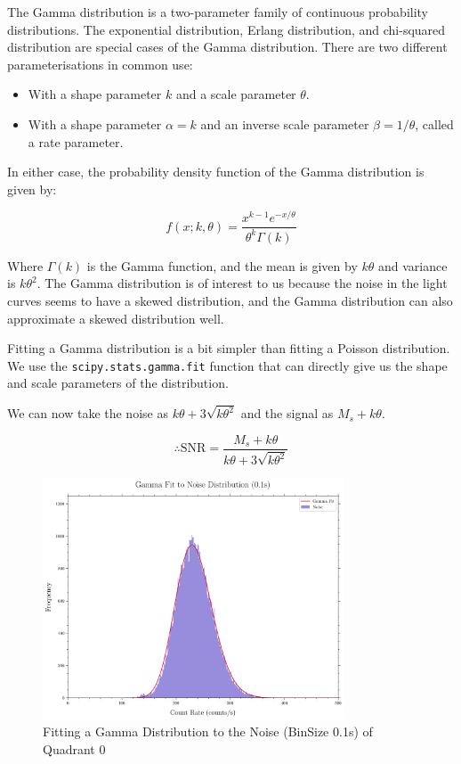 \documentclass[11pt]{book} %
\begin{document}
The Gamma distribution is a two-parameter family of continuous probability distributions. The exponential distribution, Erlang distribution, and chi-squared distribution are special cases of the Gamma distribution. There are two different parameterisations in common use:

\begin{itemize}
    \item With a shape parameter $k$ and a scale parameter $\theta$.
    \item With a shape parameter $\alpha = k$ and an inverse scale parameter $\beta = 1/\theta$, called a rate parameter.
\end{itemize}

In either case, the probability density function of the Gamma distribution is given by:

\begin{equation} \label{eq:Gamma}
    f(x; k, \theta) = \frac{x^{k-1}e^{-x/\theta}}{\theta^k\Gamma(k)}
\end{equation}
    
    Where $\Gamma(k)$ is the Gamma function, and the mean is given by $k\theta$ and variance is $k\theta^2$. The Gamma distribution is of interest to us because the noise in the light curves seems to have a skewed distribution, and the Gamma distribution can also approximate a skewed distribution well.

Fitting a Gamma distribution is a bit simpler than fitting a Poisson distribution. We use the \lstinline[language=Python]{scipy.stats.gamma.fit} function that can directly give us the shape and scale parameters of the distribution.

We can now take the noise as $k\theta + 3\sqrt{k\theta^2}$ and the signal as $M_s+k\theta$.

\begin{equation}
    \therefore \text{SNR} = \frac{M_s+k\theta}{k\theta + 3\sqrt{k\theta^2}}
\end{equation}

\begin{figure}[H]
    \centering
    \includegraphics[width=0.8\textwidth]{Pictures/gamma_fit.png}
    \caption{Fitting a Gamma Distribution to the Noise (BinSize 0.1s) of Quadrant 0}
\end{figure}
\end{document}
